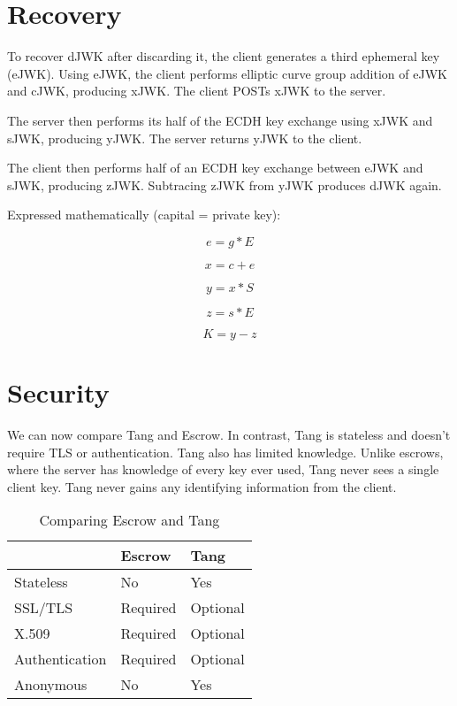 \documentclass[../xdudla00-porting-Tang-to-Open-WRT.tex]{subfiles}
\begin{document}
\section{Recovery}
To recover dJWK after discarding it, the client generates a third ephemeral key (eJWK).
Using eJWK, the client performs elliptic curve group addition of eJWK and cJWK, producing xJWK. The client POSTs xJWK to the server.

The server then performs its half of the ECDH key exchange using xJWK and sJWK, producing yJWK. The server returns yJWK to the client.

The client then performs half of an ECDH key exchange between eJWK and sJWK, producing zJWK. Subtracing zJWK from yJWK produces dJWK again.

Expressed mathematically (capital = private key):

\begin{equation}
    e = g * E
\end{equation}

\begin{equation}
    x = c + e
\end{equation}

\begin{equation}
    y = x * S
\end{equation}

\begin{equation}
    z = s * E
\end{equation}

\begin{equation}
    K = y - z
\end{equation}

\section{Security}

We can now compare Tang and Escrow. In contrast, Tang is stateless and doesn't require TLS or authentication.
Tang also has limited knowledge. Unlike escrows, where the server has knowledge of every key ever used, Tang never sees a single client key.
Tang never gains any identifying information from the client.

\begin{table}[h]
\centering
\label{compare}
\begin{tabular}{@{}lll@{}}
\toprule
               & Escrow   & Tang                         \\ \midrule
Stateless      & No       & Yes                          \\
SSL/TLS        & Required & Optional                     \\
X.509          & Required & Optional                     \\
Authentication & Required & Optional                     \\
Anonymous      & No       & Yes                          \\ \bottomrule
\end{tabular}
\caption{Comparing Escrow and Tang}
\end{table}
\end{document}

